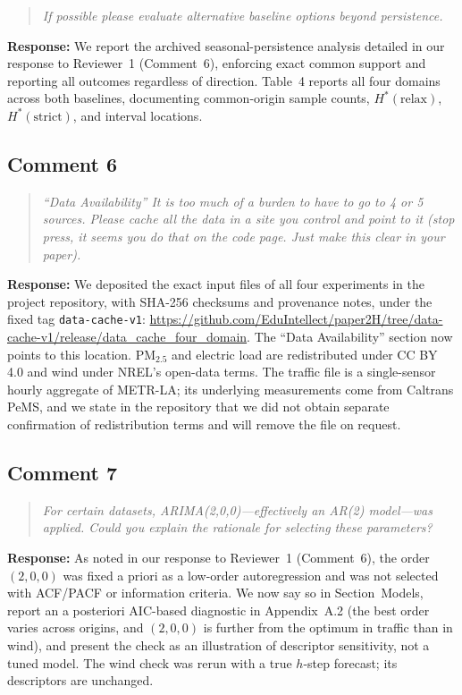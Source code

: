 \documentclass[11pt,a4paper]{article}
\let\originalsubsection\subsection
\renewcommand{\subsection}{\Needspace{9\baselineskip}\originalsubsection}
\newenvironment{reviewcomment}
  {\begin{quote}\itshape}
  {\end{quote}}
\newcommand{\response}{\noindent\textbf{Response:} }
\begin{document}
\begin{reviewcomment}
If possible please evaluate alternative baseline options beyond persistence.
\end{reviewcomment}

\response
We report the archived seasonal-persistence analysis
detailed in our response to Reviewer~1 (Comment~6), enforcing exact common
support and reporting all outcomes regardless of direction. Table~4 reports
all four domains across both baselines, documenting common-origin sample
counts, $H^*(\mathrm{relax})$, $H^*(\mathrm{strict})$, and interval locations.


\subsection*{Comment 6}

\begin{reviewcomment}
``Data Availability'' It is too much of a burden to have to go to 4 or 5 sources. Please cache all the data in a site you control and point to it (stop press, it seems you do that on the code page. Just make this clear in your paper).
\end{reviewcomment}

\response
We deposited the exact input files of all four experiments in the project
repository, with SHA-256 checksums and provenance notes, under the fixed tag
\texttt{data-cache-v1}:
\url{https://github.com/EduIntellect/paper2H/tree/data-cache-v1/release/data_cache_four_domain}.
The ``Data Availability'' section now points to this location. PM$_{2.5}$ and electric
load are redistributed under CC BY 4.0 and wind under NREL's open-data terms. The traffic file is a
single-sensor hourly aggregate of METR-LA; its underlying measurements come from Caltrans PeMS, and
we state in the repository that we did not obtain separate confirmation of redistribution terms and will
remove the file on request.


\subsection*{Comment 7}

\begin{reviewcomment}
For certain datasets, ARIMA(2,0,0)---effectively an AR(2) model---was applied. Could you explain the rationale for selecting these parameters?
\end{reviewcomment}

\response
As noted in our response to Reviewer~1 (Comment~6), the order $(2,0,0)$ was fixed
a priori as a low-order autoregression and was not selected with ACF/PACF or
information criteria. We now say so in Section~Models, report an a posteriori
AIC-based diagnostic in Appendix~A.2 (the best order varies across origins, and
$(2,0,0)$ is further from the optimum in traffic than in wind), and present the
check as an illustration of descriptor sensitivity, not a tuned model. The
wind check was rerun with a true $h$-step forecast; its descriptors are
unchanged.
\end{document}
